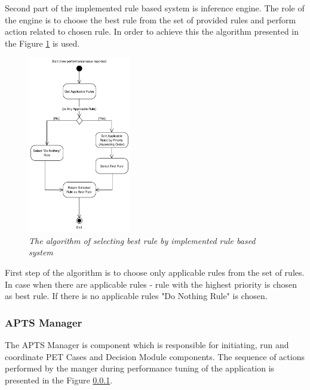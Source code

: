 \documentclass[12pt,a4paper]{article}
\begin{document}
\pagebreak


Second part of the implemented rule based system is inference engine. The role of the engine is to choose the best rule from the set of provided rules and perform action related to chosen rule. In order to achieve this the algorithm presented in the Figure \ref{dmalgorithm} is used. 

\begin{figure}[!htb]
\centering
\includegraphics[width=0.4\textwidth]{DecisionModuleActivityDiagram}
\caption{\textit{The algorithm of selecting best rule by implemented rule based system}} \label{dmalgorithm}
\end{figure}

First step of the algorithm is to choose only applicable rules from the set of rules. In case when there are applicable rules - rule with the highest priority is chosen as best rule. If there is no applicable rules "Do Nothing Rule" is chosen.

\subsubsection{APTS Manager} \label{manager}

The APTS Manager is component which is responsible for initiating, run and coordinate PET Cases and Decision Module components. The sequence of actions performed by the manger during performance tuning of the application is presented in the Figure \ref{manager}.
\end{document}
